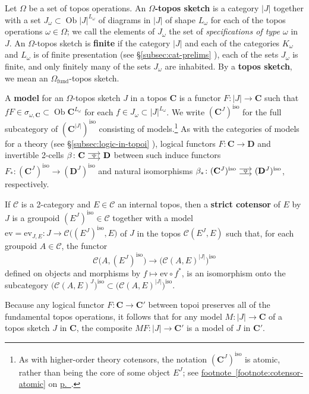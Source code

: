 \documentclass{amsart}
\newcommand\abs[2][]{#1\lvert{#2}#1\rvert}
\newcommand\bC{\mathbf{C}}
\newcommand\bD{\mathbf{D}}
\newcommand\cC{\mathcal{C}}
\newcommand\defword[1]{{\boldmath \textbf{#1}}}
\newcommand\ev{\mathrm{ev}}
\newcommand\fund{\mathrm{fund}}
\newcommand\iso{\mathrm{iso}}
\newcommand\Ob{\operatorname{Ob}}
\newcommand\pbig[1]{\big({#1}\big)}
\newcommand\tocell{\hspace{-5pt}\begin{tikzcd}[column sep=15pt, ampersand replacement=\&]{}\ar[r, shift left=3pt, ""{name=top}]\ar[r, shift right=3pt, ""'{name=bot}, start anchor=east, end anchor=west]\&{}\ar[Rightarrow, from=top, to=bot, shorten=0.5pt]\end{tikzcd}\hspace{-5pt}}
\newcommand\prerefpost[3]{%
  \texorpdfstring%
    {\hyperref[#2]{#1\ref*{#2}#3}}%
    {#1\ref*{#2}#3}%
}
\newcommand\sref[1]{\prerefpost{\S}{#1}{}}
\newcommand\pref[1]{\hyperref[#1]{p.~\pageref*{#1}}}
\theoremstyle{definition}
\theoremstyle{remark}
\theoremstyle{plainwithref}
\begin{document}
\begin{defn}
  Let \( \Omega \) be a set of topos operations.
  An \defword{\( \Omega \)-topos sketch} is a category \( \abs{J} \) together with a set \( J_\omega \subset \Ob \abs{J}^{L_{\omega}} \) of diagrams in \( \abs{J} \) of shape \( L_{\omega} \) for each of the topos operations \( \omega \in \Omega \); we call the elements of \( J_\omega \) the set of \emph{specifications of type \( \omega \)} in \( J \).
  An \( \Omega \)-topos sketch is \defword{finite} if the category \( \abs{J} \) and each of the categories \( K_\omega \) and \( L_\omega \) is of finite presentation (see \sref{subsec:cat-prelims}), each of the sets \( J_\omega \) is finite, and only finitely many of the sets \( J_\omega \) are inhabited.
  By a \defword{topos sketch}, we mean an \( \Omega_\fund \)-topos sketch.

  A \defword{model} for an \( \Omega \)-topos sketch \( J \) in a topos \( \bC \) is a functor \( F \colon \abs{J} \to \bC \) such that \( f F \in \sigma_{\omega, \bC} \subset \Ob \bC^{L_{\omega}} \) for each \( f \in J_\omega \subset \abs{J}^{L_{\omega}} \).
  We write \( (\bC^J)^\iso \) for the full subcategory of \( (\bC^{\abs{J}})^\iso \) consisting of models.\footnote{%
    As with higher-order theory cotensors, the notation \( (\bC^J)^\iso \) is atomic, rather than being the core of some object \( E^J \); see \prerefpost{footnote~}{footnote:cotensor-atomic}{} on \pref{footnote:cotensor-atomic}.%
  }
  As with the categories of models for a theory (see \sref{subsec:logic-in-topoi}), logical functors \( F \colon \bC \to \bD \) and invertible 2-cells \( \beta \colon \bC \tocell \bD \) between such induce functors \( F_* \colon (\bC^J)^\iso \to (\bD^J)^\iso \) and natural isomorphisms \( \beta_* \colon (\bC^J)^\iso \tocell (\bD^J)^\iso \), respectively.

  If \( \cC \) is a 2-category and \( E \in \cC \) an internal topos, then a \defword{strict cotensor} of \( E \) by \( J \) is a groupoid \( (E^J)^\iso \in \cC \) together with a model \( \ev = \ev_{J,E} \colon J \to \cC\pbig{(E^J)^\iso,E} \) of \( J \) in the topos \( \cC(E^J,E) \) such that, for each groupoid \( A \in \cC \), the functor
  \[
    \cC\pbig{A,(E^J)^\iso} \to \pbig{\cC(A,E)^{\abs{J}}}^\iso
  \]
  defined on objects and morphisms by \( f \mapsto \ev \circ f^* \), is an isomorphism onto the subcategory \( \pbig{\cC(A,E)^J}^\iso \subset \pbig{\cC(A,E)^{\abs{J}}}^\iso \).
\end{defn}

Because any logical functor \( F \colon \bC \to \bC' \) between topoi preserves all of the fundamental topos operations, it follows that for any model \( M \colon \abs{J} \to \bC \) of a topos sketch \( J \) in \( \bC \), the composite \( M F \colon \abs{J} \to \bC' \) is a model of \( J \) in \( \bC' \).
\end{document}

